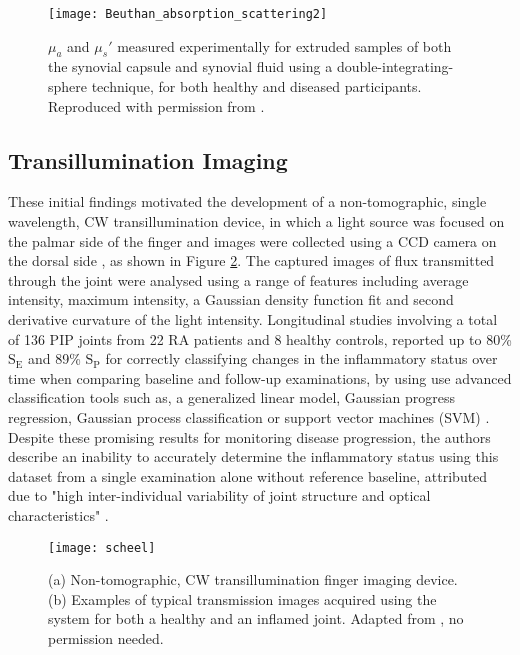 \documentclass[twoside]{bhamthesis}
\theoremstyle{definition}
\begin{document}
\begin{figure}[!ht]
\texttt{[image: Beuthan\_absorption\_scattering2]}
\centering
\caption{$\mu_a$ and $\mu_s'$ measured experimentally for extruded samples of both the synovial capsule and synovial fluid using a double-integrating-sphere technique, for both healthy and diseased participants. Reproduced with permission from \cite{beuthan2007ra}.}
\centering
\label{fig:Beuthan_absorption_scattering}
\end{figure} 

\subsection{Transillumination Imaging}
\label{Transillumination Imaging}

These initial findings motivated the development of a non-tomographic, single wavelength, CW transillumination device, in which a light source was focused on the palmar side of the finger and images were collected using a CCD camera on the dorsal side \cite{beuthan2002light,scheel2002assessment,schwaighofer2003ra,schwaighofer2003classification}, as shown in Figure \ref{fig:scheel_results}. 
The captured images of flux transmitted through the joint were analysed using a range of features including average intensity, maximum intensity, a Gaussian density function fit and second derivative curvature of the light intensity. Longitudinal studies involving a total of 136 PIP joints from 22 RA patients and 8 healthy controls, reported up to 80\% $\mathrm{S_E}$ and 89\% $\mathrm{S_P}$ for correctly classifying changes in the inflammatory status over time when comparing baseline and follow-up examinations, by using use advanced classification tools such as, a generalized linear model, Gaussian progress regression, Gaussian process classification or support vector machines (SVM) \cite{scheel2002assessment,schwaighofer2003classification}.
Despite these promising results for monitoring disease progression, the authors describe an inability to accurately determine the inflammatory status using this dataset from a single examination alone without reference baseline, attributed due to "high inter-individual variability of joint structure and optical characteristics" \cite{scheel2002assessment}.


\begin{figure}[!ht]
\texttt{[image: scheel]}
\centering
\caption{(a) Non-tomographic, CW transillumination finger imaging device. (b) Examples of typical transmission images acquired using the system for both a healthy and an inflamed joint. Adapted from \cite{schwaighofer2003classification}, no permission needed.}
\centering
\label{fig:scheel_results}
\end{figure} 
\end{document}
